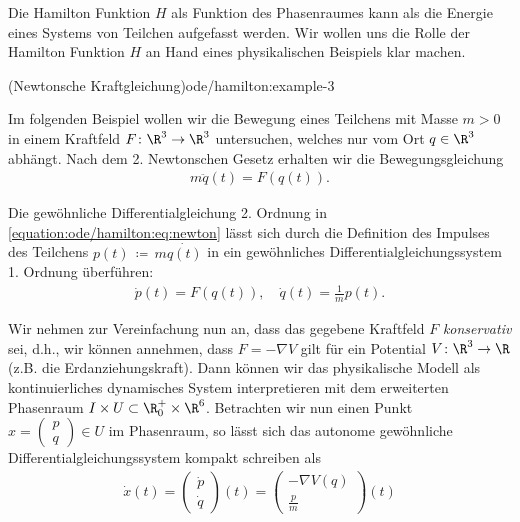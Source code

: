 \documentclass[letterpaper,10pt,english]{jupyterBook}
\begin{document}
\par
Die Hamilton Funktion \(H\) als Funktion des Phasenraumes kann als die Energie eines Systems von Teilchen aufgefasst werden.
Wir wollen uns die Rolle der Hamilton Funktion \(H\) an Hand eines physikalischen Beispiels klar machen.
\begin{example}{(Newtonsche Kraftgleichung)}{ode/hamilton:example-3}



\par
Im folgenden Beispiel wollen wir die Bewegung eines Teilchens mit Masse \(m>0\) in einem Kraftfeld \(F \colon \R^3 \rightarrow \R^3\)  untersuchen, welches nur vom Ort \(q \in \R^3\) abhängt.
Nach dem 2. Newtonschen Gesetz erhalten wir die Bewegungsgleichung
\begin{align}\label{equation:ode/hamilton:eq:newton}
m\ddot{q}(t) = F(q(t)).
\end{align}
\par
Die gewöhnliche Differentialgleichung 2. Ordnung in \eqref{equation:ode/hamilton:eq:newton} lässt sich durch die Definition des Impulses des Teilchens \(p(t) \, \coloneqq \, m \dot{q(t)}\) in ein gewöhnliches Differentialgleichungssystem 1. Ordnung überführen:
\begin{align*}
\dot{p}(t) = F(q(t)), \quad \dot{q}(t) = \frac{1}{m}p(t).
\end{align*}
\par
Wir nehmen zur Vereinfachung nun an, dass das gegebene Kraftfeld \(F\) \emph{konservativ} sei, d.h., wir können annehmen, dass \(F = - \nabla V\) gilt für ein Potential \(V \colon \R^3 \rightarrow \R\) (z.B. die Erdanziehungskraft).
Dann können wir das physikalische Modell als kontinuierliches dynamisches System interpretieren mit dem erweiterten Phasenraum \(I \times U \subset \R^+_0 \times \R^6\).
Betrachten wir nun einen Punkt \(x = \begin{pmatrix} p \\ q\end{pmatrix} \in U\) im Phasenraum, so lässt sich das autonome gewöhnliche Differentialgleichungssystem kompakt schreiben als
\begin{align}\label{equation:ode/hamilton:eq:newton_DGL}
\dot{x}(t) = \begin{pmatrix} \dot{p} \\ \dot{q} \end{pmatrix}(t) = \begin{pmatrix} -\nabla V(q) \\ \frac{p}{m} \end{pmatrix}(t)

\end{align}
\end{example}
\end{document}
